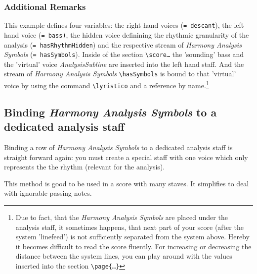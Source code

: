 \documentclass[
  DIV=calc,
  BCOR=5mm,
  12pt,
  headings=small,
  oneside,
  abstract=true,
  toc=bib,
  xcolor=dvipsnames,
  openany,
  ngerman,english]{scrartcl}
\newcommand{\acc}[0]{\textit}
\newcommand{\has}[1]{\textit{Harmony Analysis Symbol#1}}
\begin{document}
\subsubsection{Additional Remarks}

This example defines four variables: the right hand voices (\texttt{= descant}),
the left hand voice (\texttt{= bass)}, the hidden voice definining the rhythmic
granularity of the analysis (\texttt{= hasRhythmHidden}) and the respective
stream of \has{s} (\texttt{= hasSymbols}). Inside of the section
\texttt{\textbackslash score{\ldots}} the 'sounding' bass and the 'virtual'
voice \acc{AnalysisSubline} are inserted into the left hand staff. And the
stream of \has{s} \texttt{\textbackslash hasSymbols} is bound to that 'virtual'
voice by using the command \texttt{\textbackslash lyristico} and a reference by
name.\footnote{Due to fact, that the \has{s} are placed under the analysis
staff, it sometimes happens, that next part of your score (after the system
'linefeed') is not sufficiently separated from the system above. Hereby it
becomes difficult to read the score fluently. For increasing or decreasing the
distance between the system lines, you can play around with the values inserted
into the section \texttt{\textbackslash page\{\ldots\}}}


\subsection{Binding \has{s} to a dedicated analysis staff}

Binding a row of \has{s} to a dedicated analysis staff is straight forward
again: you must create a special staff with one voice which only represents the
the rhythm (relevant for the analysis). 

This method is good to be used in a score with many staves. It simplifies to deal
with ignorable passing notes.
\end{document}

